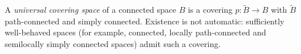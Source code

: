 
A \emph{universal covering space} of a connected space $B$ is a covering $p:\widetilde B\to B$ with $\widetilde B$ path-connected and simply connected. Existence is not automatic: sufficiently well-behaved spaces (for example, connected, locally path-connected and semilocally simply connected spaces) admit such a covering.
